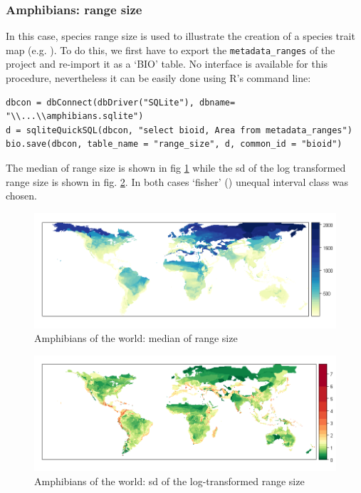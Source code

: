 \documentclass[ a4paper ]{article}
\newenvironment{Rcode}
{\begin{list}{}{\setlength{\leftmargin}{1em}}\item\scriptsize\bfseries}
{\end{list}}
\begin{document}
\subsubsection{Amphibians: range size}
In this case, species range size is used to illustrate the creation of a species trait map (e.g. \cite{orme06} ).  To do this, we first have to export the \texttt{metadata\_ranges} of the project and re-import it as a `BIO' table. No interface is available for this procedure, nevertheless it can be easily done using R's command line: 

\begin{Rcode}
\begin{verbatim}
dbcon = dbConnect(dbDriver("SQLite"), dbname= "\\...\\amphibians.sqlite")
d = sqliteQuickSQL(dbcon, "select bioid, Area from metadata_ranges")
bio.save(dbcon, table_name = "range_size", d, common_id = "bioid")
\end{verbatim}
\end{Rcode}

The median of range size is shown in fig \ref{fig:map1a} while the sd of the log transformed range size is shown in fig. \ref{fig:map1b}. In both cases `fisher' (\cite{classInt}) unequal interval class was chosen.


\begin{figure}[htbp]
  \begin{center}
	\includegraphics[width=1\linewidth]{map1a}
    \caption{\label{fig:map1a} Amphibians of the world: median of range size}
  \end{center}
\end{figure}

\begin{figure}[htbp]
  \begin{center}
	\includegraphics[width=1\linewidth]{map1b}
    \caption{\label{fig:map1b} Amphibians of the world: sd of the log-transformed range size}
  \end{center}
\end{figure}
\end{document}
